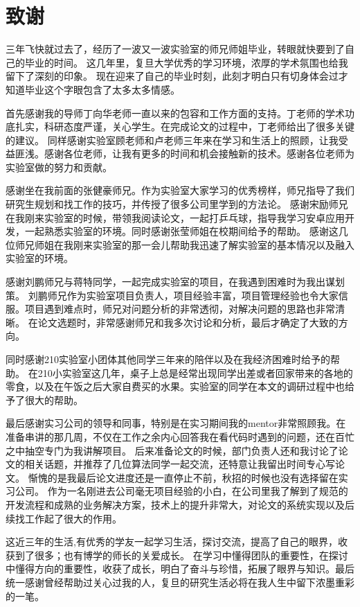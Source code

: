 \chapter{致谢}

三年飞快就过去了，经历了一波又一波实验室的师兄师姐毕业，转眼就快要到了自己的毕业的时间。 
这几年里，复旦大学优秀的学习环境，浓厚的学术氛围也给我留下了深刻的印象。
现在迎来了自己的毕业时刻，此刻才明白只有切身体会过才知道毕业这个字眼包含了太多太多情感。

首先感谢我的导师丁向华老师一直以来的包容和工作方面的支持。丁老师的学术功底扎实，科研态度严谨，关心学生。在完成论文的过程中，丁老师给出了很多关键的建议。
同样感谢实验室顾老师和卢老师三年来在学习和生活上的照顾，让我受益匪浅。感谢各位老师，让我有更多的时间和机会接触新的技术。感谢各位老师为实验室做的努力和贡献。

感谢坐在我前面的张健豪师兄。作为实验室大家学习的优秀榜样，师兄指导了我们研究生规划和找工作的技巧，并传授了很多公司里学到的方法论。
感谢宋励师兄在我刚来实验室的时候，带领我阅读论文，一起打乒乓球，指导我学习安卓应用开发，一起熟悉实验室的环境。同时感谢张莹师姐在校期间给予的帮助。
感谢这几位师兄师姐在我刚来实验室的那一会儿帮助我迅速了解实验室的基本情况以及融入实验室的环境。

感谢刘鹏师兄与蒋特同学，一起完成实验室的项目，在我遇到困难时为我出谋划策。
刘鹏师兄作为实验室项目负责人，项目经验丰富，项目管理经验也令大家信服。项目遇到难点时，师兄对问题分析的非常透彻，对解决问题的思路也非常清晰。
在论文选题时，非常感谢师兄和我多次讨论和分析，最后才确定了大致的方向。

同时感谢210实验室小团体其他同学三年来的陪伴以及在我经济困难时给予的帮助。
在210小实验室这几年，桌子上总是经常出现同学出差或者回家带来的各地的零食，以及在午饭之后大家自费买的水果。实验室的同学在本文的调研过程中也给予了很大的帮助。

最后感谢实习公司的领导和同事，特别是在实习期间我的mentor非常照顾我。在准备串讲的那几周，不仅在工作之余内心回答我在看代码时遇到的问题，还在百忙之中抽空专门为我讲解项目。
后来准备论文的时候，部门负责人还和我讨论了论文的相关话题，并推荐了几位算法同学一起交流，还特意让我留出时间专心写论文。
惭愧的是我最后论文进度还是一直停止不前，秋招的时候也没有选择留在实习公司。
作为一名刚进去公司毫无项目经验的小白，在公司里我了解到了规范的开发流程和成熟的业务解决方案，技术上的提升非常大，对论文的系统实现以及后续找工作起了很大的作用。




这近三年的生活,有优秀的学友一起学习生活，探讨交流，提高了自己的眼界，收获到了很多；也有博学的师长的关爱成长。
在学习中懂得团队的重要性，在探讨中懂得方向的重要性，收获了成长，明白了奋斗与珍惜，拓展了眼界与知识。最后统一感谢曾经帮助过关心过我的人，复旦的研究生活必将在我人生中留下浓墨重彩的一笔。